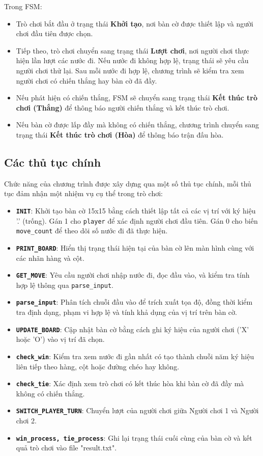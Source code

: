 Trong FSM:
\begin{itemize}
    \item Trò chơi bắt đầu ở trạng thái \textbf{Khởi tạo}, nơi bàn cờ được thiết lập và người chơi đầu tiên được chọn.
    \item Tiếp theo, trò chơi chuyển sang trạng thái \textbf{Lượt chơi}, nơi người chơi thực hiện lần lượt các nước đi. Nếu nước đi không hợp lệ, trạng thái sẽ yêu cầu người chơi thử lại. Sau mỗi nước đi hợp lệ, chương trình sẽ kiểm tra xem người chơi có chiến thắng hay bàn cờ đã đầy.
    \item Nếu phát hiện có chiến thắng, FSM sẽ chuyển sang trạng thái \textbf{Kết thúc trò chơi (Thắng)} để thông báo người chiến thắng và kết thúc trò chơi.
    \item Nếu bàn cờ được lấp đầy mà không có chiến thắng, chương trình chuyển sang trạng thái \textbf{Kết thúc trò chơi (Hòa)} để thông báo trận đấu hòa.
\end{itemize}

\subsection{Các thủ tục chính}
Chức năng của chương trình được xây dựng qua một số thủ tục chính, mỗi thủ tục đảm nhận một nhiệm vụ cụ thể trong trò chơi:

\begin{itemize}
    \item \textbf{\texttt{INIT}}: Khởi tạo bàn cờ 15x15 bằng cách thiết lập tất cả các vị trí với ký hiệu '.' (trống). Gán 1 cho \texttt{player} để xác định người chơi đầu tiên. Gán 0 cho biến \texttt{move\_count} để theo dõi số nước đi đã thực hiện.
    \item \textbf{\texttt{PRINT\_BOARD}}: Hiển thị trạng thái hiện tại của bàn cờ lên màn hình cùng với các nhãn hàng và cột.
    \item \textbf{\texttt{GET\_MOVE}}: Yêu cầu người chơi nhập nước đi, đọc đầu vào, và kiểm tra tính hợp lệ thông qua \texttt{parse\_input}.
    \item \textbf{\texttt{parse\_input}}: Phân tích chuỗi đầu vào để trích xuất tọa độ, đồng thời kiểm tra định dạng, phạm vi hợp lệ và tính khả dụng của vị trí trên bàn cờ.
    \item \textbf{\texttt{UPDATE\_BOARD}}: Cập nhật bàn cờ bằng cách ghi ký hiệu của người chơi ('X' hoặc 'O') vào vị trí đã chọn.
    \item \textbf{\texttt{check\_win}}: Kiểm tra xem nước đi gần nhất có tạo thành chuỗi năm ký hiệu liên tiếp theo hàng, cột hoặc đường chéo hay không.
    \item \textbf{\texttt{check\_tie}}: Xác định xem trò chơi có kết thúc hòa khi bàn cờ đã đầy mà không có chiến thắng.
    \item \textbf{\texttt{SWITCH\_PLAYER\_TURN}}: Chuyển lượt của người chơi giữa Người chơi 1 và Người chơi 2.
    \item \textbf{\texttt{win\_process, tie\_process}}: Ghi lại trạng thái cuối cùng của bàn cờ và kết quả trò chơi vào file "result.txt".
\end{itemize}


